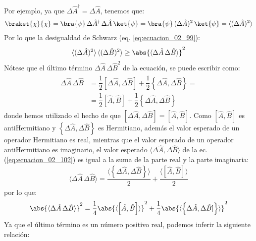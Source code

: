 Por ejemplo, ya que $\Delta \hat{A}^{\dagger} = \Delta \hat{A}$, tenemos que:
\begin{align*}
\braket{\chi}{\chi} = \bra{\psi} \, \Delta \hat{A}^{\dagger} \, \Delta \hat{A} \, \ket{\psi} = \bra{\psi} \, (\Delta \hat{A})^{2} \, \ket{\psi} = \langle (\Delta \hat{A})^{2} \rangle
\end{align*}
Por lo que la desigualdad de Schwarz (eq. \ref{eq:ecuacion_02_99}):
\begin{equation}
\langle (\Delta \hat{A})^{2} \rangle \, \langle (\Delta \hat{B})^{2} \rangle \geq \abs{\langle \Delta \hat{A} \, \Delta \hat{B}\rangle}^{2} 
\label{eq:ecuacion_02_101}
\end{equation}
Nótese que el último término $\Delta \hat{A} \, \Delta \hat{B}^{2}$ de la ecuación, se puede escribir como:
\begin{align}
\begin{aligned}
\Delta \hat{A} \, \Delta \hat{B} &= \dfrac{1}{2} \left[ \Delta \hat{A} , \Delta \hat{B} \right] + \dfrac{1}{2} \left\{ \Delta \hat{A} , \Delta \hat{B} \right\} = \\[0.5em]
&= \dfrac{1}{2}  \left[ \hat{A} , \hat{B} \right] + \dfrac{1}{2} \left\{ \Delta \hat{A} , \Delta \hat{B} \right\}
\end{aligned}
\label{eq:ecuacion_02_102}
\end{align}
donde hemos utilizado el hecho de que $[\Delta \hat{A},\Delta \hat{B}]= [\hat{A}, \hat{B}]$. Como $[\hat{A}, \hat{B}]$ es antiHermitiano y $\left\{ \Delta \hat{A},\Delta \hat{B} \right\}$ es Hermitiano, además el valor esperado de un operador Hermitiano es real, mientras que el valor esperado de un operador antiHermitiano es imaginario, el valor esperado $\langle \Delta \hat{A}, \Delta \hat{B} \rangle$ de la ec. (\ref{eq:ecuacion_02_102}) es igual a la suma de la parte real y la parte imaginaria:
\begin{align*}
\langle \Delta \hat{A} \, \Delta \hat{B} \rangle = \dfrac{\langle \left\{ \Delta \hat{A},\Delta \hat{B} \right\} \rangle}{2} + \dfrac{\langle [\hat{A}, \hat{B}] \rangle}{2}
\end{align*}
por lo que:
\begin{equation}
\abs{ \langle \Delta \hat{A} \, \Delta \hat{B} \rangle}^{2} = \dfrac{1}{4} \abs{\langle \left[ \hat{A}, \hat{B} \right] \rangle}^{2} + \dfrac{1}{4} \abs{ \langle \left\{ \Delta \hat{A}, \Delta \hat{B}] \right\} \rangle}^{2}
\label{eq:ecuacion_02_103}
\end{equation}
Ya que el último término es un número positivo real, podemos inferir la siguiente relación:
